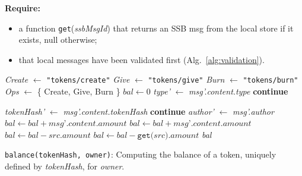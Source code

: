 \documentclass[sigplan,screen,10pt]{acmart}
\begin{document}
\begin{algorithm}
\begin{algorithmic}[1]
  \State \textbf{Require:} 
  \begin{itemize}
    \item a function \texttt{get}(\textit{ssbMsgId}) that returns an SSB msg from the local store if it exists, null otherwise;
    \item that local messages have been validated first (Alg.~\ref{alg:validation}).
  \end{itemize}
  \State
  \State \textit{Create} $\leftarrow$ \texttt{"tokens/create"}
  \State \textit{Give} $\leftarrow$ \texttt{"tokens/give"}
  \State \textit{Burn} $\leftarrow$ \texttt{"tokens/burn"}
  \State \textit{Ops} $\leftarrow$ \{ Create, Give, Burn \}
  \State
  \State $\textit{bal} \leftarrow 0$
      \State \textit{type'} $\leftarrow$ \textit{msg'.content.type}
       \textbf{continue}
      \EndIf

   \State
    \State \textit{tokenHash'} $\leftarrow$ \textit{msg'.content.tokenHash}
      \textbf{continue}
    \EndIf
    \State
    \State \textit{author'} $\leftarrow$ \textit{msg'.author}
    	\State $\textit{bal} \leftarrow \textit{bal} + \textit{msg'.content.amount}$
             \State $\textit{bal} \leftarrow \textit{bal} + \textit{msg'.content.amount}$
        \EndIf
                 \State $\textit{bal} \leftarrow \textit{bal} - \textit{src.amount}$    
             \EndFor    
        \EndIf
             \State $\textit{bal} \leftarrow \textit{bal} - \texttt{get}(\textit{src).amount}$    
         \EndFor    
    \EndIf
  \EndFor
  \State \Return \textit{bal}
\end{algorithmic}
\caption{\texttt{balance(tokenHash, owner)}: Computing the balance of a token, uniquely defined by \textit{tokenHash}, for \textit{owner}.}
\label{alg:balance}
\end{algorithm}
\end{document}
